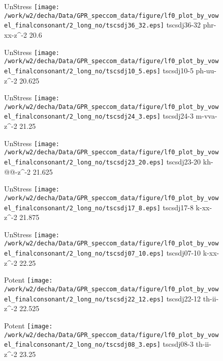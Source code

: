 \documentclass{article}
\begin{document}
\begin{figure}[t]
\begin{minipage}[b]{.24\textwidth}
UnStress
\centering
\texttt{[image: /work/w2/decha/Data/GPR\_speccom\_data/figure/lf0\_plot\_by\_vowel\_finalconsonant/2\_long\_no/tscsdj36\_32.eps]}
tscsdj36-32 phr-xx-z\textasciicircum-2 20.6
\end{minipage}
\begin{minipage}[b]{.24\textwidth}
UnStress
\centering
\texttt{[image: /work/w2/decha/Data/GPR\_speccom\_data/figure/lf0\_plot\_by\_vowel\_finalconsonant/2\_long\_no/tscsdj10\_5.eps]}
tscsdj10-5 ph-uu-z\textasciicircum-2 20.625
\end{minipage}
\begin{minipage}[b]{.24\textwidth}
UnStress
\centering
\texttt{[image: /work/w2/decha/Data/GPR\_speccom\_data/figure/lf0\_plot\_by\_vowel\_finalconsonant/2\_long\_no/tscsdj24\_3.eps]}
tscsdj24-3 m-vva-z\textasciicircum-2 21.25
\end{minipage}
\begin{minipage}[b]{.24\textwidth}
UnStress
\centering
\texttt{[image: /work/w2/decha/Data/GPR\_speccom\_data/figure/lf0\_plot\_by\_vowel\_finalconsonant/2\_long\_no/tscsdj23\_20.eps]}
tscsdj23-20 kh-@@-z\textasciicircum-2 21.625
\end{minipage}
\end{figure}
\clearpage
\begin{figure}[t]
\begin{minipage}[b]{.24\textwidth}
UnStress
\centering
\texttt{[image: /work/w2/decha/Data/GPR\_speccom\_data/figure/lf0\_plot\_by\_vowel\_finalconsonant/2\_long\_no/tscsdj17\_8.eps]}
tscsdj17-8 k-xx-z\textasciicircum-2 21.875
\end{minipage}
\begin{minipage}[b]{.24\textwidth}
UnStress
\centering
\texttt{[image: /work/w2/decha/Data/GPR\_speccom\_data/figure/lf0\_plot\_by\_vowel\_finalconsonant/2\_long\_no/tscsdj07\_10.eps]}
tscsdj07-10 k-xx-z\textasciicircum-2 22.25
\end{minipage}
\begin{minipage}[b]{.24\textwidth}
\colorbox{Apricot}{Potent}
\centering
\texttt{[image: /work/w2/decha/Data/GPR\_speccom\_data/figure/lf0\_plot\_by\_vowel\_finalconsonant/2\_long\_no/tscsdj22\_12.eps]}
tscsdj22-12 th-ii-z\textasciicircum-2 22.525
\end{minipage}
\begin{minipage}[b]{.24\textwidth}
\colorbox{Apricot}{Potent}
\centering
\texttt{[image: /work/w2/decha/Data/GPR\_speccom\_data/figure/lf0\_plot\_by\_vowel\_finalconsonant/2\_long\_no/tscsdj08\_3.eps]}
tscsdj08-3 th-ii-z\textasciicircum-2 23.25
\end{minipage}
\end{figure}
\end{document}
